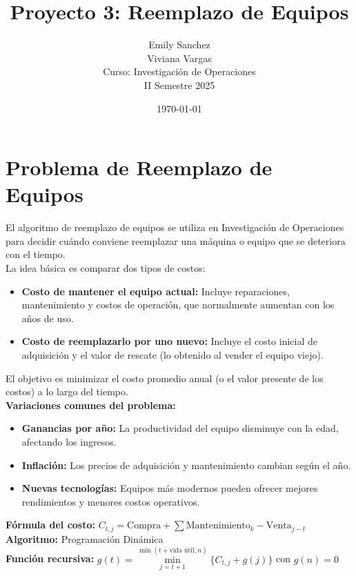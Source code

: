 \documentclass[12pt]{article}
\title{Proyecto 3: Reemplazo de Equipos}
\author{Emily Sanchez \\ Viviana Vargas \\[1cm] Curso: Investigación de Operaciones \\ II Semestre 2025}
\date{\today}
\begin{document}
\maketitle
\newpage
\section*{Problema de Reemplazo de Equipos}
El algoritmo de reemplazo de equipos se utiliza en Investigación de Operaciones para decidir cuándo conviene reemplazar una máquina o equipo que se deteriora con el tiempo.\\
La idea básica es comparar dos tipos de costos:\\
\begin{itemize}
\item \textbf{Costo de mantener el equipo actual:} Incluye reparaciones, mantenimiento y costos de operación, que normalmente aumentan con los años de uso.\\
\item \textbf{Costo de reemplazarlo por uno nuevo:} Incluye el costo inicial de adquisición y el valor de rescate (lo obtenido al vender el equipo viejo).\\
\end{itemize}
El objetivo es minimizar el costo promedio anual (o el valor presente de los costos) a lo largo del tiempo.\\
\textbf{Variaciones comunes del problema:}\\
\begin{itemize}
\item \textbf{Ganancias por año:} La productividad del equipo disminuye con la edad, afectando los ingresos.\\
\item \textbf{Inflación:} Los precios de adquisición y mantenimiento cambian según el año.\\
\item \textbf{Nuevas tecnologías:} Equipos más modernos pueden ofrecer mejores rendimientos y menores costos operativos.\\
\end{itemize}
\textbf{Fórmula del costo:} $C_{t,j} = \text{Compra} + \sum \text{Mantenimiento}_k - \text{Venta}_{j-t}$\\
\textbf{Algoritmo:} Programación Dinámica \\
\textbf{Función recursiva:} $g(t) = \min\limits_{j=t+1}^{\min(t+\text{vida útil}, n)} \{C_{t,j} + g(j)\}$ con $g(n) = 0$\\
\end{document}
